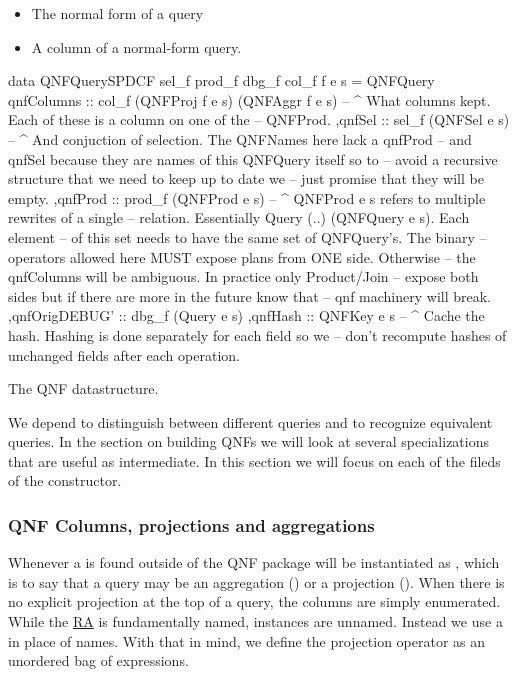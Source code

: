 \begin{itemize}
\item The normal form of a query
\item A column of a normal-form query.
\end{itemize}

\begin{code}
  \begin{haskellcode}
    data QNFQuerySPDCF sel_f prod_f dbg_f col_f f e s =
    QNFQuery
    { qnfColumns :: col_f (QNFProj f e s) (QNFAggr f e s)
      -- ^ What columns kept. Each of these is a column on one of the
      -- QNFProd.
      ,qnfSel :: sel_f (QNFSel e s)
      -- ^ And conjuction of selection. The QNFNames here lack a qnfProd
      -- and qnfSel because they are names of this QNFQuery itself so to
      -- avoid a recursive structure that we need to keep up to date we
      -- just promise that they will be empty.
      ,qnfProd :: prod_f (QNFProd e s)
      -- ^ QNFProd e s refers to multiple rewrites of a single
      -- relation. Essentially {Query (..) (QNFQuery e s)}. Each element
      -- of this set needs to have the same set of QNFQuery's. The binary
      -- operators allowed here MUST expose plans from ONE side. Otherwise
      -- the qnfColumns will be ambiguous. In practice only Product/Join
      -- expose both sides but if there are more in the future know that
      -- qnf machinery will break.
      ,qnfOrigDEBUG' :: dbg_f (Query e s)
      ,qnfHash :: QNFKey e s
      -- ^ Cache the hash. Hashing is done separately for each field so we
      -- don't recompute hashes of unchanged fields after each operation.
    }
  \end{haskellcode}
  \caption{\label{org4e7446e}The QNF datastructure.}
\end{code}


We depend to distinguish between different queries and to recognize
equivalent queries. In the section on building QNFs we will look at
several specializations that are useful as intermediate. In this
section we will focus on each of the fileds of the 
constructor.
\subsubsection{QNF Columns, projections and aggregations}
\label{sec:orgba02a81}
Whenever a  is found outside of the QNF package  will
be instantiated as , which is to say that a query may be an
aggregation () or a projection (). When there is no
explicit projection at the top of a query, the columns are simply
enumerated. While the \hyperref[sec:relational_algebra_semantics]{RA} is fundamentally named,  instances
are unnamed. Instead we use a  in place of names. With that
in mind, we define the projection operator as an unordered bag of
expressions.

